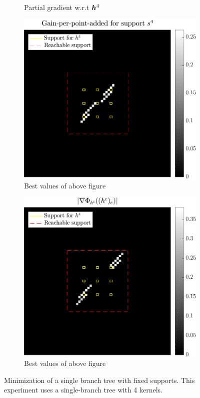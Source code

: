 \begin{figure}[!ht]
\begin{subfigure}[b]{0.4\linewidth}
\caption{Partial gradient w.r.t $\bm{h}^4$}
\end{subfigure}
\begin{subfigure}[b]{0.4\linewidth}\centering
\includegraphics[width=\linewidth]{figures/xp/n4/xp_128x128_sc2_angl1_K3_S3_node4_objmatrix_bestvalues.pdf}
\caption{Best values of above figure}
\end{subfigure}
\begin{subfigure}[b]{0.4\linewidth}\centering
\includegraphics[width=\linewidth]{figures/xp/n4/xp_128x128_sc2_angl1_K3_S3_node4_partgrad4_bestvalues.pdf}
\caption{Best values of above figure}
\end{subfigure}
\caption{Minimization of a single branch tree with fixed supports. This experiment uses a single-branch tree with 4 kernels.}\label{fig_gain_n4}
\end{figure}


